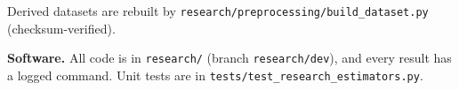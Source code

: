 \documentclass[11pt]{article}
\begin{document}
Derived datasets are rebuilt by
\texttt{research/preprocessing/build\_dataset.py} (checksum-verified).

\textbf{Software.} All code is in \texttt{research/} (branch
\texttt{research/dev}), and every result has a logged command. Unit
tests are in \texttt{tests/test\_research\_estimators.py}.




\end{document}
